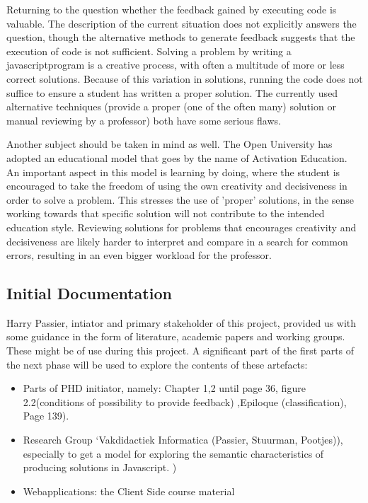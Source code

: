 \documentclass{article}
\begin{document}
Returning to the question whether the feedback gained by executing code is valuable. The description of the current situation does not explicitly answers the question, though the alternative methods to generate feedback suggests that the execution of code is not sufficient. Solving a problem by writing a javascriptprogram is a creative process, with often a multitude of more or less correct solutions. Because of this variation in solutions, running the code does not suffice to ensure a student has written a proper solution. The currently used alternative techniques (provide a proper (one of the often many) solution or manual reviewing by a professor) both have some serious flaws. 

Another subject should be taken in mind as well. The Open University has adopted an educational model that goes by the name of Activation Education. An important aspect in this model is learning by doing, where the student is encouraged to take the freedom of using the own creativity and decisiveness in order to solve a problem. This stresses the use of 'proper' solutions, in the sense working towards that specific solution will not contribute to the intended education style. Reviewing solutions for problems that encourages creativity and decisiveness are likely harder to interpret and compare in a search for common errors, resulting in an even bigger workload for the professor. 

\subsection{Initial Documentation}

Harry Passier, intiator and primary stakeholder of this project, provided us with some guidance in the form of literature, academic papers and working groups. These might be of use during this project. A significant part of the first parts of the next phase will be used to explore the contents of these artefacts:
\begin{itemize}
  \item Parts of PHD initiator, namely: Chapter 1,2 until page 36, figure 2.2(conditions of possibility to provide feedback) ,Epiloque (classification), Page 139).
  \item Research Group ‘Vakdidactiek Informatica (Passier, Stuurman, Pootjes)), especially to get a model for exploring the semantic characteristics of producing solutions in Javascript. )
  \item Webapplications: the Client Side course material
\end{itemize}
\end{document}
